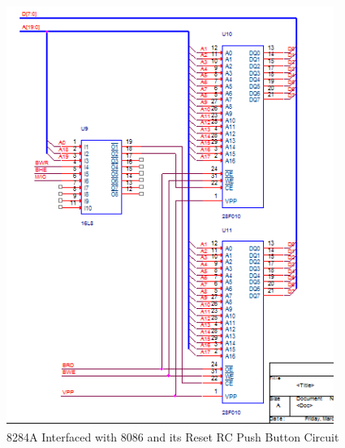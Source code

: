         \begin{figure}[ht]
            \begin{center}
                \includegraphics[width=0.95\textwidth]{figures/schematics/page3.png}
                \caption{8284A Interfaced with 8086 and its Reset RC Push Button Circuit} \label{fig:page3}
            \end{center}
        \end{figure}

